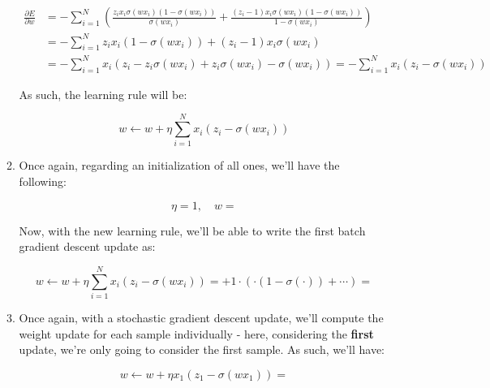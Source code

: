 \documentclass[12pt]{article}
\begin{document}
\begin{enumerate}[leftmargin=\labelsep]
\begin{enumerate}
{          \begin{align*}
            \frac{\partial E}{\partial w} & = - \sum_{i=1}^N \left(
            \frac{z_i x_i \sigma(w x_i) (1 - \sigma(w x_i))}{\sigma(w x_i)} +
            \frac{(z_i - 1) x_i \sigma (w x_i) (1 - \sigma(w x_i))}{1 - \sigma(w x_i)}
            \right)                                                                                                    \\
                                          & = - \sum_{i=1}^N z_i x_i (1 - \sigma(w x_i)) + (z_i - 1) x_i \sigma(w x_i) \\
                                          & = - \sum_{i=1}^N x_i \left(
            z_i - z_i \sigma(w x_i) + z_i \sigma(w x_i) - \sigma(w x_i)
            \right) = - \sum_{i=1}^N x_i (z_i - \sigma(w x_i))
          \end{align*}

          As such, the learning rule will be:

          $$
            w \leftarrow w + \eta \sum_{i=1}^N x_i (z_i - \sigma(w x_i))
          $$
          }
    \item {
          Once again, regarding an initialization of all ones, we'll have the following:

          $$
            \eta = 1, \quad w = 
          $$

          Now, with the new learning rule, we'll be able to write the first batch
          gradient descent update as:

          $$
            w \leftarrow w + \eta \sum_{i=1}^N x_i (z_i - \sigma(w x_i))
            =  + 1 \cdot \left(
             \cdot \left(
              1 - \sigma( \cdot )
              \right)
            + \cdots \right) = 
          $$

          }
    \item {
          Once again, with a stochastic gradient descent update, we'll compute the weight update
          for each sample individually - here, considering the \textbf{first} update,
          we're only going to consider the first sample. As such, we'll have:

          $$
            w \leftarrow w + \eta x_1 (z_1 - \sigma(w x_1)) = 
          $$
          }
  \end{enumerate}


\end{enumerate}
\end{document}
